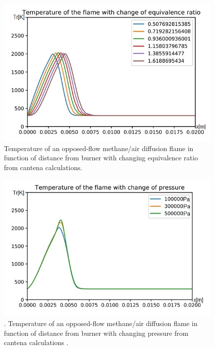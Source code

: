\documentclass[a4paper]{article}
\begin{document}
\begin{figure}
\includegraphics[width=1\textwidth]{3.jpg}
\caption{\label{fig:3}Temperature of an opposed-flow methane/air diffusion flame in function of distance from burner with changing equivalence ratio from cantena calculations.}
\end{figure}

\begin{figure}
\includegraphics[width=1\textwidth]{4.jpg}
\caption{\label{fig:4}. Temperature of an opposed-flow methane/air diffusion flame in function of distance from burner with changing pressure from cantena calculations .}
\end{figure}
\end{document}
